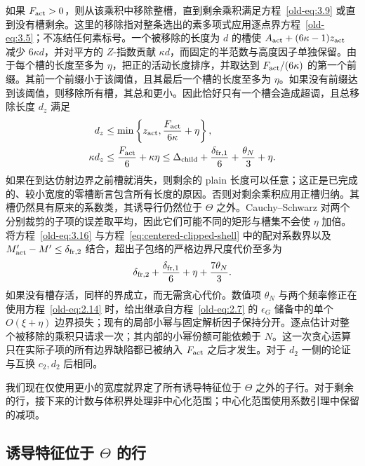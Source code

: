 \documentclass[11pt,a4paper]{article}
\numberwithin{equation}{section}
\numberwithin{figure}{section}
\theoremstyle{definition}
\theoremstyle{remark}
\begin{document}
如果 \(F_{\rm act}>0\)，则从该乘积中移除整槽，直到剩余乘积满足方程~\eqref{old-eq:3.9} 或直到没有槽剩余。这里的移除指对整条选出的素多项式应用逐点界方程~\eqref{old-eq:3.5}；不冻结任何素标号。一个被移除的长度为 \(d\) 的槽使 \(A_{\rm act}+(6\kappa-1)z_{\rm act}\) 减少 \(6\kappa d\)，并对平方的 \(Z\)-指数贡献 \(\kappa d\)，而固定的半范数与高度因子单独保留。由于每个槽的长度至多为 \(\eta\)，把正的活动长度排序，并取达到 \(F_{\rm act}/(6\kappa)\) 的第一个前缀。其前一个前缀小于该阈值，且其最后一个槽的长度至多为 \(\eta\)。如果没有前缀达到该阈值，则移除所有槽，其总和更小。因此恰好只有一个槽会造成超调，且总移除长度 \(d_z\) 满足
\begin{equation}
 \begin{split}
 d_z&\le\min\left\{z_{\rm act},
                     \frac{F_{\rm act}}{6\kappa}+\eta\right\},\\
 \kappa d_z&\le\frac{F_{\rm act}}6+\kappa\eta
 \le\Delta_{\rm child}+\frac{\delta_{{\rm fr},1}}6
                       +\frac{\theta_N}{3}+\eta.
 \end{split}
 \label{old-eq:3.16}
\end{equation}
如果在到达仿射边界之前槽就消失，则剩余的 plain 长度可以任意；这正是已完成的、较小宽度的零槽断言包含所有长度的原因。否则对剩余乘积应用正槽归纳。其槽仍然具有原来的系数类，其诱导行仍然位于 \(\Theta\) 之外。Cauchy--Schwarz 对两个分别裁剪的子项的误差取平均，因此它们可能不同的矩形与槽集不会使 \(\eta\) 加倍。将方程~\eqref{old-eq:3.16} 与方程~\eqref{eq:centered-clipped-shell} 中的配对系数界以及 \(M'_{\rm act}-M'\le\delta_{{\rm fr},2}\) 结合，超出子包络的严格边界尺度代价至多为
\begin{equation}
 \delta_{{\rm fr},2}+\frac{\delta_{{\rm fr},1}}6
        +\eta+\frac{7\theta_N}{3}.
 \label{eq:centered-child-edge-cost}
\end{equation}
如果没有槽存活，同样的界成立，而无需贪心代价。数值项 \(\theta_N\) 与两个频率修正在使用方程~\eqref{old-eq:2.14} 时，给出继承自方程~\eqref{old-eq:2.7} 的 \(\epsilon_G\) 储备中的单个 \(O(\xi+\eta)\) 边界损失；现有的局部小幂与固定解析因子保持分开。逐点估计对整个被移除的乘积只请求一次；其内部的小幂份额可能依赖于 \(N\)。这一次贪心运算只在实际子项的所有边界缺陷都已被纳入 \(F_{\rm act}\) 之后才发生。对于 \(d_2\) 一侧的论证与互换 \(c_2,d_2\) 后相同。

我们现在仅使用更小的宽度就界定了所有诱导特征位于 \(\Theta\) 之外的子行。对于剩余的行，接下来的计数与体积界处理非中心化范围；中心化范围使用系数引理中保留的减项。

\subsection{诱导特征位于 \texorpdfstring{\(\Theta\)}{Theta} 的行}
\end{document}
